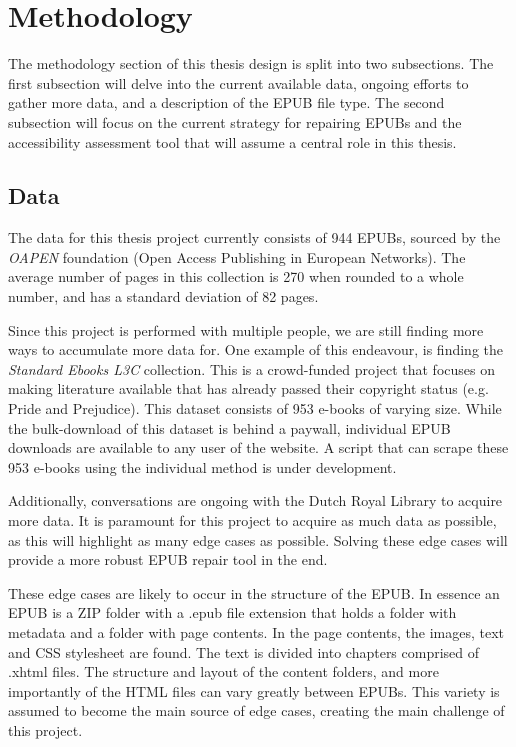 \section{Methodology}
\label{sec:methodology}
The methodology section of this thesis design is split into two subsections. The first subsection will delve into the current available data, ongoing efforts to gather more data, and a description of the EPUB file type. The second subsection will focus on the current strategy for repairing EPUBs and the accessibility assessment tool that will assume a central role in this thesis.

\subsection{Data}
The data for this thesis project currently consists of 944 EPUBs, sourced by the \textit{OAPEN} foundation (Open Access Publishing in European Networks). The average number of pages in this collection is 270 when rounded to a whole number, and has a standard deviation of 82 pages.

Since this project is performed with multiple people, we are still finding more ways to accumulate more data for. One example of this endeavour, is finding the \textit{Standard Ebooks L3C} collection. This is a crowd-funded project that focuses on making literature available that has already passed their copyright status (e.g. Pride and Prejudice). This dataset consists of 953 e-books of varying size. While the bulk-download of this dataset is behind a paywall, individual EPUB downloads are available to any user of the website. A script that can scrape these 953 e-books using the individual method is under development.

Additionally, conversations are ongoing with the Dutch Royal Library to acquire more data. It is paramount for this project to acquire as much data as possible, as this will highlight as many edge cases as possible. Solving these edge cases will provide a more robust EPUB repair tool in the end. 

These edge cases are likely to occur in the structure of the EPUB. In essence an EPUB is a ZIP folder with a .epub file extension that holds a folder with metadata and a folder with page contents. In the page contents, the images, text and CSS stylesheet are found. The text is divided into chapters comprised of .xhtml files. The structure and layout of the content folders, and more importantly of the HTML files can vary greatly between EPUBs. This variety is assumed to become the main source of edge cases, creating the main challenge of this project.

